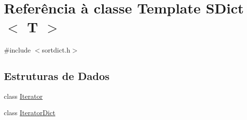 \hypertarget{class_s_dict}{\section{Referência à classe Template S\-Dict$<$ T $>$}
\label{class_s_dict}
}


{\ttfamily \#include $<$sortdict.\-h$>$}

\subsection*{Estruturas de Dados}
\begin{DoxyCompactItemize}
\item 
class \hyperlink{class_s_dict_1_1_iterator}{Iterator}
\item 
class \hyperlink{class_s_dict_1_1_iterator_dict}{Iterator\-Dict}
\end{DoxyCompactItemize}
